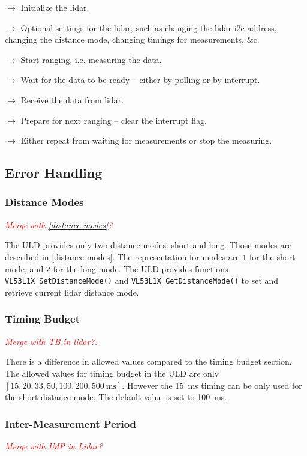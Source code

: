 \documentclass[
  digital,     %
  oneside,     %
  nosansbold,  %
  nocolorbold, %
  lof,         %
  lot,         %
]{fithesis4}
\newcommand{\TODO}[1]{\textcolor{red}{\textit{#1}}}
\begin{document}
$\rightarrow$ Initialize the \acrshort{lidar}.

$\rightarrow$ Optional settings for the \acrshort{lidar}, such as changing the \acrshort{lidar} \acrshort{i2c} address, changing the distance mode, changing timings for measurements, \&c.

$\rightarrow$ Start ranging, i.e. measuring the data.

$\rightarrow$ Wait for the data to be ready -- either by polling or by interrupt.

$\rightarrow$ Receive the data from \acrshort{lidar}.

$\rightarrow$ Prepare for next ranging -- clear the interrupt flag.

$\rightarrow$ Either repeat from waiting for measurements or stop the measuring.


\subsection{Error Handling}
\subsubsection{ Distance Modes }
\TODO{Merge with \ref{distance-modes}?}

The ULD provides only two distance modes: short and long. Those modes are described in \ref{distance-modes}. The representation for modes are \lstinline|1| for the short mode, and \lstinline|2| for the long mode. The ULD provides functions \lstinline|VL53L1X_SetDistanceMode()| and \lstinline|VL53L1X_GetDistanceMode()| to set and retrieve current \acrshort{lidar} distance mode.

\subsubsection{ Timing Budget }
\TODO{Merge with TB in lidar?.}

There is a difference in allowed values compared to the timing budget section. The allowed values for timing budget in the ULD are only $[15, 20,
33, 50, 100, 200, \qty{500}{\milli\second}]$. However the \qty{15}{\milli\second} timing can be only used for the short distance mode. The default value is set to \qty{100}{\milli\second}.

\subsubsection{ Inter-Measurement Period }
\TODO{Merge with IMP in Lidar?}
\end{document}
